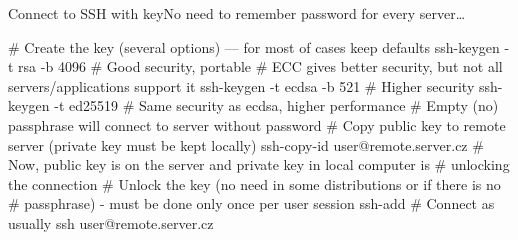 \documentclass[compress, xelatex, 11pt, xcolor=svgnames, aspectratio=169, url={hyphens, lowtilde}]{beamer}
\begin{document}
\begin{frame}[fragile]{Connect to SSH with key}{No need to remember password for every server\ldots}
	\begin{bashcode}
    # Create the key (several options) --- for most of cases keep defaults
    ssh-keygen -t rsa -b 4096 # Good security, portable
    # ECC gives better security, but not all servers/applications support it
    ssh-keygen -t ecdsa -b 521 # Higher security
    ssh-keygen -t ed25519 # Same security as ecdsa, higher performance
    # Empty (no) passphrase will connect to server without password
    # Copy public key to remote server (private key must be kept locally)
    ssh-copy-id user@remote.server.cz
    # Now, public key is on the server and private key in local computer is
    # unlocking the connection
    # Unlock the key (no need in some distributions or if there is no
    # passphrase) - must be done only once per user session
    ssh-add
    # Connect as usually
    ssh user@remote.server.cz
	\end{bashcode}
\end{frame}
\end{document}
